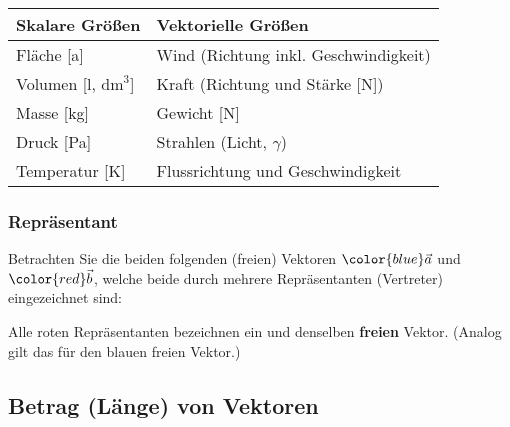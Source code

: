 \begin{tabular}{ll}\hline
  Skalare Größen& Vektorielle Größen\\\hline

  Fläche [a]                   & Wind (Richtung inkl. Geschwindigkeit)\\
  Volumen [l, $\text{dm}^3$] & Kraft (Richtung und Stärke [N])\\
  Masse [kg]                   & Gewicht [N]\\
  Druck [Pa]                   & Strahlen (Licht, $\gamma$)\\
  Temperatur [K]               & Flussrichtung und Geschwindigkeit
\end{tabular}
\newpage




\subsubsection{Repräsentant}
Betrachten Sie die beiden folgenden (freien) Vektoren ${\color{blue} \vec{a}}$ und
${\color{red}\vec{b}}$, welche beide durch mehrere Repräsentanten
(Vertreter) eingezeichnet sind:


Alle {\color{red} roten} Repräsentanten bezeichnen ein und denselben
\textbf{freien} Vektor. (Analog gilt das für den {\color{blue} blauen} freien Vektor.)

\newpage


\subsection{Betrag (Länge) von Vektoren}


